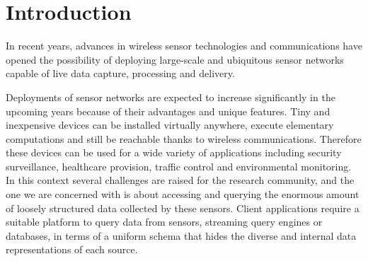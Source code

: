 \section{Introduction}
\label{intro}
In recent years, advances in wireless sensor technologies and communications have opened the possibility of deploying large-scale and ubiquitous sensor networks capable of live data capture, processing and delivery.
 
Deployments of sensor networks are expected to increase significantly in the upcoming years because of their advantages and unique features. Tiny and inexpensive devices can be installed virtually anywhere, execute elementary computations and still be reachable thanks to wireless communications. Therefore these devices can be used for a wide variety of applications including security surveillance, healthcare provision, traffic control and environmental monitoring.
In this context several challenges are raised for the research community, and the one we are concerned with is about accessing and querying the enormous amount of loosely structured data collected by these sensors. Client applications require a suitable platform to query data from sensors, streaming query engines or databases, in terms of a uniform schema that hides the diverse and internal data representations of each source.

